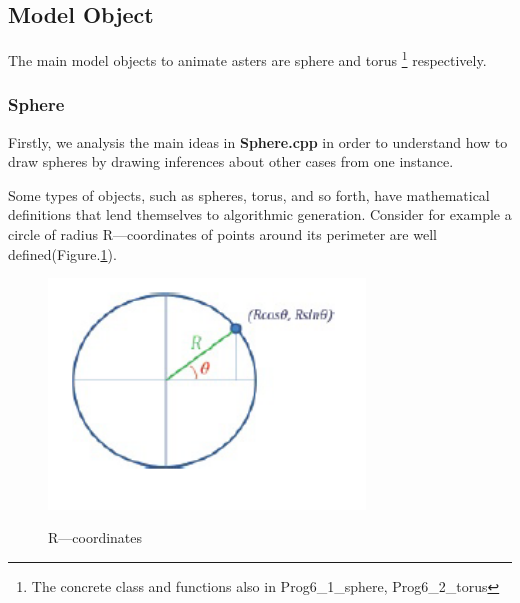 \documentclass[12pt]{article}
\numberwithin{figure}{subsection}
\numberwithin{table}{subsection}
\numberwithin{equation}{subsection}
\begin{document}
\subsection{Model Object}
The main model objects to animate asters are sphere and torus
\footnote{The concrete class and functions also in Prog6\_1\_sphere, Prog6\_2\_torus} respectively.

\subsubsection{Sphere}\label{sec:sphere}
Firstly, we analysis the main ideas in \textbf{Sphere.cpp} in order to understand how to draw spheres 
by drawing inferences about other cases from one instance.

Some types of objects, such as spheres, torus, and so forth, have
mathematical definitions that lend themselves to algorithmic generation.
Consider for example a circle of radius R—coordinates of points around its
perimeter are well defined(Figure.\ref{fig:Rcoord}).
\begin{figure}[!htbp]
	\centering
	\includegraphics[width=0.75\textwidth]{image/R-coord.png}
	\caption{R—coordinates}
    \label{fig:Rcoord}
    \cite{alma991002986248905076}
\end{figure}
\end{document}
